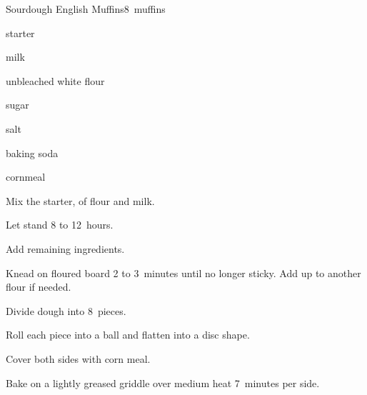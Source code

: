 \begin{recipe}{Sourdough English Muffins}{}{8~muffins}

\begin{ingredients}
\item \C{\half} starter
\item {} milk
\item \C{2 \half} unbleached white flour
\item {} sugar
\item \tp{\threequarter} salt
\item \tp{\half} baking soda
\item cornmeal
\end{ingredients}

\begin{directions}
\item Mix the starter,  of flour and milk.
\item Let stand 8 to 12~hours.
\item Add remaining ingredients.
\item Knead on floured board 2 to 3~minutes until no longer sticky. Add up to another \C{\quarter} flour if needed.
\item Divide dough into 8~pieces.
\item Roll each piece into a ball and flatten into a disc shape.
\item Cover both sides with corn meal.
\item Bake on a lightly greased griddle over medium heat 7~minutes per side.
\end{directions}

\end{recipe}
